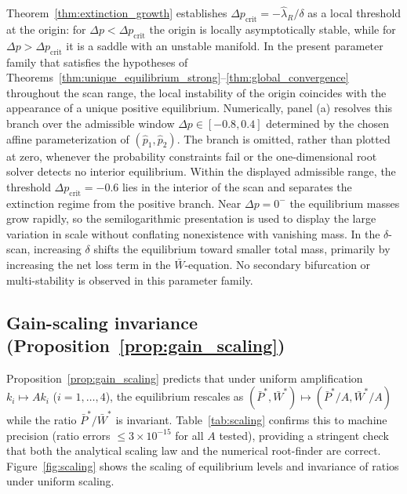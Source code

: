 \documentclass[pdflatex,sn-mathphys-ay]{sn-jnl}
\theoremstyle{thmstyleone}
\theoremstyle{definition}
\theoremstyle{remark}
\begin{document}
Theorem~\ref{thm:extinction_growth} establishes $\Delta p_{\mathrm{crit}}=-\hat\lambda_R/\delta$
as a local threshold at the origin: for $\Delta p<\Delta p_{\mathrm{crit}}$ the origin is
locally asymptotically stable, while for $\Delta p>\Delta p_{\mathrm{crit}}$ it is a saddle with an unstable manifold.
In the present parameter family that satisfies the hypotheses of
Theorems~\ref{thm:unique_equilibrium_strong}--\ref{thm:global_convergence} throughout
the scan range, the local instability of the origin coincides with the appearance of a
  unique positive equilibrium. Numerically, panel (a) resolves this branch over the admissible
  window $\Delta p\in[-0.8,0.4]$ determined by the chosen affine parameterization of
  $(\hat p_1,\hat p_2)$. The branch is omitted, rather than plotted at zero, whenever the
  probability constraints fail or the one-dimensional root solver detects no interior equilibrium.
  Within the displayed admissible range, the threshold $\Delta p_{\mathrm{crit}}=-0.6$ lies in the
  interior of the scan and separates the extinction regime from the positive branch. Near
  $\Delta p=0^-$ the equilibrium masses grow rapidly, so the semilogarithmic presentation is used
  to display the large variation in scale without conflating nonexistence with vanishing mass.
  In the $\delta$-scan, increasing $\delta$ shifts the equilibrium toward smaller total mass,
  primarily by increasing the net loss term in the $\bar W$-equation.
  No secondary bifurcation or multi-stability is observed in this parameter family.

\subsection{Gain-scaling invariance (Proposition~\ref{prop:gain_scaling})}
\label{subsubsec:scaling}
Proposition~\ref{prop:gain_scaling} predicts that under uniform amplification
$k_i\mapsto A k_i$ ($i=1,\dots,4$), the equilibrium rescales as
$(\bar P^*,\bar W^*)\mapsto(\bar P^*/A,\bar W^*/A)$
while the ratio $\bar P^*/\bar W^*$ is invariant.
Table~\ref{tab:scaling} confirms this to machine precision
(ratio errors $\le 3\times 10^{-15}$ for all $A$ tested),
providing a stringent check that both the analytical scaling law
and the numerical root-finder are correct. Figure~\ref{fig:scaling} shows the scaling of equilibrium levels and invariance of ratios under uniform scaling. 
\end{document}
